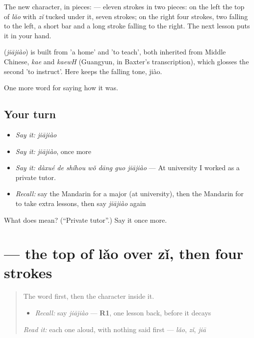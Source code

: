 The new character, in pieces:  — eleven strokes in two pieces: on the left the top of  \emph{lǎo} with  \emph{zǐ} tucked under it, seven strokes; on the right four strokes, two falling to the left, a short bar and a long stroke falling to the right. The next lesson puts it in your hand.

\begin{cousinweb}
\textbf{} (\emph{jiājiào}) is built from  'a home' and  'to teach', both inherited from Middle Chinese, \emph{kae} and \emph{kaewH} (Guangyun, in Baxter's transcription), which glosses the second 'to instruct'. Here  keeps the falling tone, jiào.
\end{cousinweb}

\begin{grammarlens}[title={What you've built}]
One more word for saying how it was.
\end{grammarlens}

\subsection*{Your turn}
\begin{itemize}
\raggedright
  \item \emph{Say it:} \emph{jiājiào}
  \item \emph{Say it:} \emph{jiājiào}, once more
  \item \emph{Say it:} \emph{dàxué de shíhou wǒ dāng guo jiājiào} — At university I worked as a private tutor.
  \item \emph{Recall:} say the Mandarin for a major (at university), then the Mandarin for to take extra lessons, then say \emph{jiājiào} again
\end{itemize}

\begin{tcolorbox}[breakable,colback=teal!4,colframe=teal!35!black,title={Before you move on}]
What does  mean? (\textquotedblleft{}Private tutor\textquotedblright{}.) Say it once more.
\end{tcolorbox}
\section[\texorpdfstring{\zh{教} (jiào)}{教 (jiào)}]{ — the top of lǎo over zǐ, then four strokes}

\label{lesson:ZH-W493-jiao-instruct}



\begin{quote}
The word first, then the character inside it.

\begin{itemize}
\raggedright
  \item \emph{Recall:} say \emph{jiājiào} — \textbf{R1}, one lesson back, before it decays
\end{itemize}

\begin{quote}
  
\end{quote}

\emph{Read it:} each one aloud, with nothing said first — \emph{lǎo}, \emph{zǐ}, \emph{jiā}
\end{quote}

